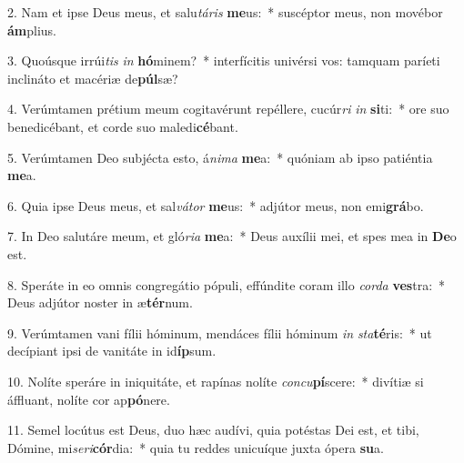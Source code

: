 2. Nam et ipse Deus meus, et salu\textit{tá}\textit{ris} \textbf{me}us:~*  suscéptor meus, non movébor \textbf{ám}plius.\

3. Quoúsque irrúi\textit{tis} \textit{in} \textbf{hó}minem?~*  interfícitis univérsi vos: tamquam paríeti inclináto et macériæ de\textbf{púl}sæ?\

4. Verúmtamen prétium meum cogitavérunt repéllere, cucúr\textit{ri} \textit{in} \textbf{si}ti:~*  ore suo benedicébant, et corde suo maledi\textbf{cé}bant.\

5. Verúmtamen Deo subjécta esto, á\textit{ni}\textit{ma} \textbf{me}a:~*  quóniam ab ipso patiéntia \textbf{me}a.\

6. Quia ipse Deus meus, et sal\textit{vá}\textit{tor} \textbf{me}us:~*  adjútor meus, non emi\textbf{grá}bo.\

7. In Deo salutáre meum, et gló\textit{ri}\textit{a} \textbf{me}a:~*  Deus auxílii mei, et spes mea in \textbf{De}o est.\

8. Speráte in eo omnis congregátio pópuli, effúndite coram illo \textit{cor}\textit{da} \textbf{ves}tra:~*  Deus adjútor noster in æ\textbf{tér}num.\

9. Verúmtamen vani fílii hóminum, mendáces fílii hóminum \textit{in} \textit{sta}\textbf{té}ris:~*  ut decípiant ipsi de vanitáte in id\textbf{íp}sum.\

10. Nolíte speráre in iniquitáte, et rapínas nolíte \textit{con}\textit{cu}\textbf{pí}scere:~*  divítiæ si áffluant, nolíte cor ap\textbf{pó}nere.\

11. Semel locútus est Deus, duo hæc audívi, quia potéstas Dei est, et tibi, Dómine, mi\textit{se}\textit{ri}\textbf{cór}dia:~*  quia tu reddes unicuíque juxta ópera \textbf{su}a.\

